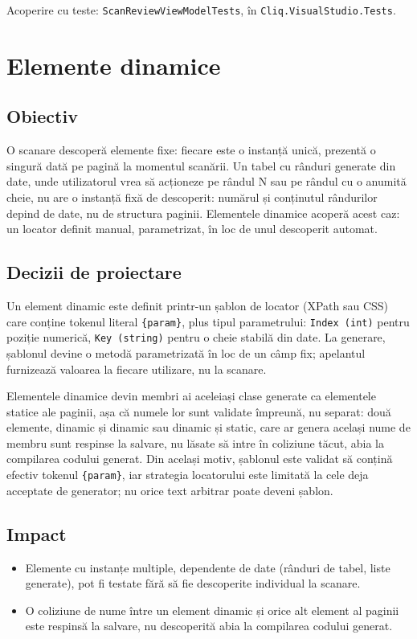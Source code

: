 \documentclass[12pt,a4paper]{report}
\newcommand{\File}[1]{\nolinkurl{#1}}
\begin{document}
Acoperire cu teste: \File{ScanReviewViewModelTests}, în \File{Cliq.VisualStudio.Tests}.

\chapter{Elemente dinamice}

\section{Obiectiv}

O scanare descoperă elemente fixe: fiecare este o instanță unică, prezentă o singură dată pe pagină la momentul scanării. Un tabel cu rânduri generate din date, unde utilizatorul vrea să acționeze pe rândul N sau pe rândul cu o anumită cheie, nu are o instanță fixă de descoperit: numărul și conținutul rândurilor depind de date, nu de structura paginii. Elementele dinamice acoperă acest caz: un locator definit manual, parametrizat, în loc de unul descoperit automat.

\section{Decizii de proiectare}

Un element dinamic este definit printr-un șablon de locator (XPath sau CSS) care conține tokenul literal \File{\{param\}}, plus tipul parametrului: \File{Index (int)} pentru poziție numerică, \File{Key (string)} pentru o cheie stabilă din date. La generare, șablonul devine o metodă parametrizată în loc de un câmp fix; apelantul furnizează valoarea la fiecare utilizare, nu la scanare.

Elementele dinamice devin membri ai aceleiași clase generate ca elementele statice ale paginii, așa că numele lor sunt validate împreună, nu separat: două elemente, dinamic și dinamic sau dinamic și static, care ar genera același nume de membru sunt respinse la salvare, nu lăsate să intre în coliziune tăcut, abia la compilarea codului generat. Din același motiv, șablonul este validat să conțină efectiv tokenul \File{\{param\}}, iar strategia locatorului este limitată la cele deja acceptate de generator; nu orice text arbitrar poate deveni șablon.

\section{Impact}

\begin{itemize}
  \item Elemente cu instanțe multiple, dependente de date (rânduri de tabel, liste generate), pot fi testate fără să fie descoperite individual la scanare.
  \item O coliziune de nume între un element dinamic și orice alt element al paginii este respinsă la salvare, nu descoperită abia la compilarea codului generat.
\end{itemize}
\end{document}
